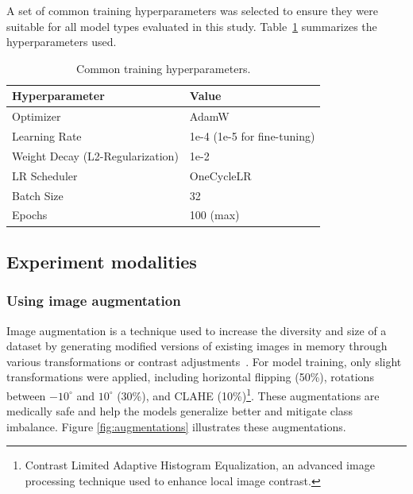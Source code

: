 \documentclass[a4paper,10pt]{book}
\begin{document}
A set of common training hyperparameters was selected to ensure they were suitable for all model types evaluated in this study. Table~\ref{tab:hyperparams} summarizes the hyperparameters used.


\begin{table}[h!]
    \caption[Libraries]{Common training hyperparameters.}
    \centering
    \begin{tabular}{l l}
        \toprule
        \textbf{Hyperparameter} & \textbf{Value} \\
        \midrule
        Optimizer  & AdamW \\

        Learning Rate  & 1e-4 (1e-5 for fine-tuning) \\
 
        Weight Decay (L2-Regularization) & 1e-2 \\

        LR Scheduler & OneCycleLR \\
   
        Batch Size & 32 \\

        Epochs & 100 (max) \\
        \bottomrule
    \end{tabular}
    \label{tab:hyperparams}
\end{table}

\subsection{Experiment modalities}

\subsubsection{Using image augmentation}

Image augmentation is a technique used to increase the diversity and size of a dataset by generating modified versions of existing images in memory through various transformations or contrast adjustments~\cite{noauthor_complete_nodate}. For model training, only slight transformations were applied, including horizontal flipping (50\%), rotations between $-10^\circ$ and $10^\circ$ (30\%), and CLAHE (10\%)\footnote{Contrast Limited Adaptive Histogram Equalization, an advanced image processing technique used to enhance local image contrast.}. These augmentations are medically safe and help the models generalize better and mitigate class imbalance. Figure \ref{fig:augmentations} illustrates these augmentations.
\end{document}
